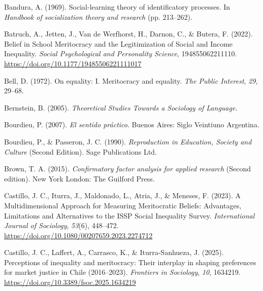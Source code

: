 \documentclass[
  13pt,
]{article}
\newlength{\cslhangindent}
\newenvironment{CSLReferences}[2] %
 {\begin{list}{}{%
  \setlength{\itemindent}{0pt}
  \setlength{\leftmargin}{0pt}
  \setlength{\parsep}{0pt}
  \ifodd #1
   \setlength{\leftmargin}{\cslhangindent}
   \setlength{\itemindent}{-1\cslhangindent}
  \fi
  \setlength{\itemsep}{#2\baselineskip}}}
 {\end{list}}
\begin{document}
\label{refs}
\begin{CSLReferences}{1}{0}
Bandura, A. (1969). Social-learning theory of identificatory processes.
In \emph{Handbook of socialization theory and research} (pp. 213--262).

Batruch, A., Jetten, J., Van de Werfhorst, H., Darnon, C., \& Butera, F.
(2022). Belief in {School Meritocracy} and the {Legitimization} of
{Social} and {Income Inequality}. \emph{Social Psychological and
Personality Science}, 194855062211110.
\url{https://doi.org/10.1177/19485506221111017}

Bell, D. (1972). On equality: {I}. {Meritocracy} and equality. \emph{The
Public Interest}, \emph{29}, 29--68.

Bernstein, B. (2005). \emph{Theoretical {Studies Towards} a {Sociology}
of {Language}}.

Bourdieu, P. (2007). \emph{{El sentido práctico}}. Buenos Aires: Siglo
Veintiuno Argentina.

Bourdieu, P., \& Passeron, J. C. (1990). \emph{Reproduction in
{Education}, {Society} and {Culture}} (Second Edition). Sage
Publications Ltd.

Brown, T. A. (2015). \emph{Confirmatory factor analysis for applied
research} (Second edition). New York London: The Guilford Press.

Castillo, J. C., Iturra, J., Maldonado, L., Atria, J., \& Meneses, F.
(2023). A {Multidimensional Approach} for {Measuring Meritocratic
Beliefs}: {Advantages}, {Limitations} and {Alternatives} to the {ISSP
Social Inequality Survey}. \emph{International Journal of Sociology},
\emph{53}(6), 448--472.
\url{https://doi.org/10.1080/00207659.2023.2274712}

Castillo, J. C., Laffert, A., Carrasco, K., \& Iturra-Sanhueza, J.
(2025). Perceptions of inequality and meritocracy: Their interplay in
shaping preferences for market justice in {Chile} (2016--2023).
\emph{Frontiers in Sociology}, \emph{10}, 1634219.
\url{https://doi.org/10.3389/fsoc.2025.1634219}


\end{CSLReferences}
\end{document}
